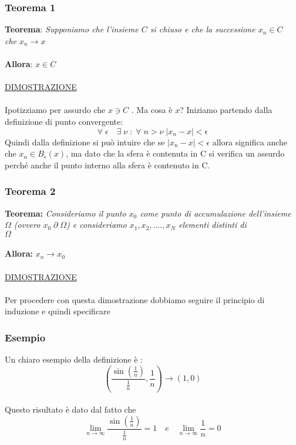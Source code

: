 \documentclass[fontsize = 20px, paper = a4]{article}
\begin{document}
\subsubsection{Teorema 1}
\textbf{Teorema}: \emph{Supponiamo che l'insieme $C$ si chiuso e che la successione $x_n \in C$ \\
\hspace*{1.7cm} che $x_n \to x$} \\ \\
\textbf{Allora}: \hspace*{0.5cm}$x  \in C$ \\ \\
\underline{DIMOSTRAZIONE } \\ \\ 
Ipotizziamo per assurdo che $x \ni C$	.
Ma cosa è $x$? Iniziamo partendo dalla definizione di punto convergente:
$$\forall \; \epsilon \quad \exists \; \nu \; : \; \forall \; n > \nu \; |x_n - x| < \epsilon$$
Quindi dalla definizione si può intuire che se $|x_n - x| < \epsilon$ allora significa anche che $x_n \in B_\epsilon (x)$, ma dato che la sfera è contenuta in C si verifica un assurdo perché anche il punto interno alla sfera è contenuto in C.
\subsubsection{Teorema 2}
\textbf{Teorema: }\emph{Consideriamo il punto $x_0$ come punto di accumulazione dell'insieme \\
\hspace*{1.7cm} $\Omega$ (ovvero $x_0 \; \partial \; \Omega$) e consideriamo $x_1,x_2,....,x_N$ elementi distinti di  \\
\hspace*{1.7cm } $\Omega$} \\ \\
\textbf{Allora: } \hspace*{0.3cm}$x_n \to x_0$ \\ \\ 
\underline{DIMOSTRAZIONE} \\ \\
Per procedere con questa dimostrazione dobbiamo seguire il principio di induzione e quindi specificare


\subsubsection{Esempio}
Un chiaro esempio della definizione è :
$$\left( \frac{\sin\left(\frac{1}{n}\right)}{\frac{1}{n}},\frac{1}{n}\right) \longrightarrow \left(1,0\right)$$ \\ 
Questo risultato è dato dal fatto che 
$$\lim_{n \to \infty} \frac{\sin\left(\frac{1}{n}\right)}{\frac{1}{n}} = 1 \quad e \quad \lim_{n \to \infty}\frac{1}{n} = 0$$
\end{document}
